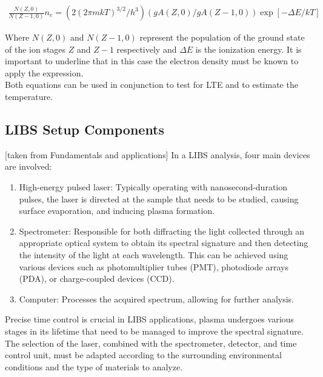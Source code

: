 \begin{align}
   \frac{N\left(Z,0\right)}{N\left(Z-1,0\right)}n_{e}=\left(2\left(2\pi m k T\right)^{3/2}/h^3\right)\left(gA\left(Z,0\right)/gA\left(Z-1,0\right)\right)\exp{\left[-\Delta E/kT\right]} \label{eq:saha_equation}  
\end{align}

Where $N(Z,0)$ and $N(Z-1,0)$ represent the population of the ground state of the ion stages $Z$ and $Z-1$ respectively and $\Delta E$ is the ionization energy. It is important to underline that in this case the electron density must be known to apply the expression.
\\
Both equations can be used in conjunction to test for LTE and to estimate the temperature.

\subsection{LIBS Setup Components}
\label{subsec:libs_setup_component}
[taken from Fundamentals and applications]
In a LIBS analysis, four main devices are involved:
\begin{enumerate}
    \item High-energy pulsed laser: Typically operating with nanosecond-duration pulses, the laser is directed at the sample that needs to be studied, causing surface evaporation, and inducing plasma formation.
    \item Spectrometer: Responsible for both diffracting the light collected through an appropriate optical system to obtain its spectral signature and then detecting the intensity of the light at each wavelength. This can be achieved using various devices such as photomultiplier tubes (PMT), photodiode arrays (PDA), or charge-coupled devices (CCD). 
    \item Computer: Processes the acquired spectrum, allowing for further analysis.
\end{enumerate}

Precise time control is crucial in LIBS applications, plasma undergoes various stages in its lifetime that need to be managed to improve the spectral signature.
\\
The selection of the laser, combined with the spectrometer, detector, and time control unit, must be adapted according to the surrounding environmental conditions and the type of materials to analyze.

